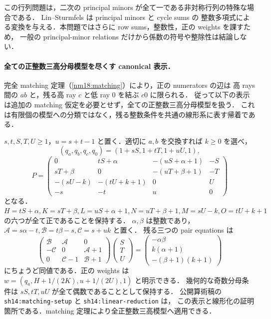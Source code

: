 この行列問題は，二次の principal minors が全て一である非対称行列の特殊な場合である．
Lin--Sturmfels\cite[\S2, Proposition~4]{LinSturmfels} は principal minors と cycle sums の
整数多項式による変換を与える．本問題ではさらに row sums，整数性，正の weights を課すため，
一般の principal-minor relations だけから係数の符号や整除性は結論しない．

\paragraph{全ての正整数三高分母模型を尽くす canonical 表示．}
完全 matching 定理（\ref{nm18:matching}）により，正の numerators の辺は
高 rays 間の $ab$ と，残る高 ray $c$ と低 ray $0$ を結ぶ $c0$ に限られる．
従って以下の表示は追加の matching 仮定を必要とせず，全ての正整数三高分母模型を扱う．
これは有限個の模型への分類ではなく，残る整数条件を共通の線形系に表す帰着である．

$s,t,S,T,U\ge1$，$u=s+t-1$ と置く．適切に $a,b$ を交換すれば $k\ge0$ を選べ，
\[
 (q_a,q_b,q_c,q_0)=(1+sS,1+tT,1+uU,1),
\]
\[
 P=\begin{pmatrix}
 0&tS+\alpha&-(uS+\alpha+1)&-S\\
 sT+\beta&0&-(uT+\beta+1)&-T\\
 -(sU-k)&-(tU+k+1)&0&U\\
 -s&-t&u&0
 \end{pmatrix}
\]
となる．$H=tS+\alpha,K=sT+\beta,L=uS+\alpha+1,N=uT+\beta+1,
M=sU-k,O=tU+k+1$ の六つが全て正であることを保持する．
$\alpha,\beta$ は整数であり，
$\mathcal A=s\alpha-t,\mathcal B=t\beta-s,\mathcal C=s+uk$ と置く．
残る三つの pair equations は
\[
 \begin{pmatrix}
  \mathcal B&\mathcal A&0\\
  -\mathcal C&0&\mathcal A+1\\
  0&\mathcal C-1&\mathcal B+1
 \end{pmatrix}
 \begin{pmatrix}S\\T\\U\end{pmatrix}
 =\begin{pmatrix}
 -\alpha\beta\\k(\alpha+1)\\-(\beta+1)(k+1)
 \end{pmatrix}
\]
にちょうど同値である．正の weights は
$w=(q_a,H+1/(2K),u+1/(2U),1)$ と明示できる．
幾何的な奇数分母条件は $sS,tT,uU$ が全て偶数であることとして保持する．
公開算術稿の \texttt{sh14:matching-setup} と \texttt{sh14:linear-reduction} は，
この表示と線形化の証明箇所である．matching 定理により全正整数三高模型へ適用できる．

